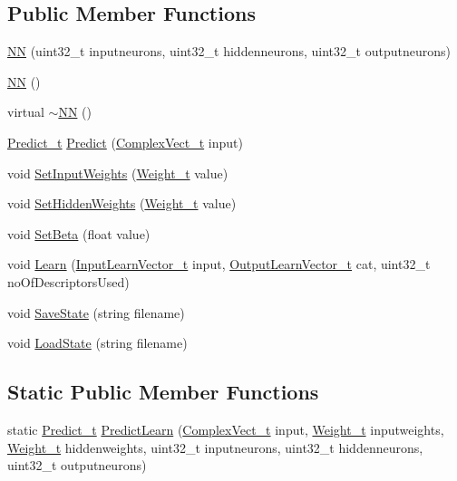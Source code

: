 \subsection*{Public Member Functions}
\begin{DoxyCompactItemize}
\item 
\hyperlink{class_soil_math_1_1_n_n_a46efd1eb7e31be2818c9858b640fcb5b}{N\+N} (uint32\+\_\+t inputneurons, uint32\+\_\+t hiddenneurons, uint32\+\_\+t outputneurons)
\item 
\hyperlink{class_soil_math_1_1_n_n_a778606ea8a193479da233a030d1df234}{N\+N} ()
\item 
virtual \hyperlink{class_soil_math_1_1_n_n_a37cb0ebe3576af3cf47c2e6330e1b34a}{$\sim$\+N\+N} ()
\item 
\hyperlink{_soil_math_types_8h_aaeba766195a440b2539f0438d3d41f95}{Predict\+\_\+t} \hyperlink{class_soil_math_1_1_n_n_aa7f23fcdb8383a74586c9c30b8bc0af7}{Predict} (\hyperlink{_soil_math_types_8h_a7567e521c2b2c408dcb62dbff72390f7}{Complex\+Vect\+\_\+t} input)
\item 
void \hyperlink{class_soil_math_1_1_n_n_a411371d8297e9d1ff10c919d1293d80e}{Set\+Input\+Weights} (\hyperlink{_soil_math_types_8h_ac56ad2b88186620fd0de0d213aa715dd}{Weight\+\_\+t} value)
\item 
void \hyperlink{class_soil_math_1_1_n_n_a8465f4fd2aebe181601c4be31df47ffd}{Set\+Hidden\+Weights} (\hyperlink{_soil_math_types_8h_ac56ad2b88186620fd0de0d213aa715dd}{Weight\+\_\+t} value)
\item 
void \hyperlink{class_soil_math_1_1_n_n_a5a73fdf65b39d81b6185de3a3b315cdb}{Set\+Beta} (float value)
\item 
void \hyperlink{class_soil_math_1_1_n_n_a8550b524ed096712bb2fad9fa57b8c8d}{Learn} (\hyperlink{_soil_math_types_8h_a45aa81992bf0ddf272907bd4fa0b96cf}{Input\+Learn\+Vector\+\_\+t} input, \hyperlink{_soil_math_types_8h_a2d8b5a261688166d724b68addd8561e6}{Output\+Learn\+Vector\+\_\+t} cat, uint32\+\_\+t no\+Of\+Descriptors\+Used)
\item 
void \hyperlink{class_soil_math_1_1_n_n_ac01bcc755578095ebf1f1f0e951f2678}{Save\+State} (string filename)
\item 
void \hyperlink{class_soil_math_1_1_n_n_a69c00e336b11531e25d51262da10fea0}{Load\+State} (string filename)
\end{DoxyCompactItemize}
\subsection*{Static Public Member Functions}
\begin{DoxyCompactItemize}
\item 
static \hyperlink{_soil_math_types_8h_aaeba766195a440b2539f0438d3d41f95}{Predict\+\_\+t} \hyperlink{class_soil_math_1_1_n_n_ac758bdef758439af30a62c486dff79ca}{Predict\+Learn} (\hyperlink{_soil_math_types_8h_a7567e521c2b2c408dcb62dbff72390f7}{Complex\+Vect\+\_\+t} input, \hyperlink{_soil_math_types_8h_ac56ad2b88186620fd0de0d213aa715dd}{Weight\+\_\+t} inputweights, \hyperlink{_soil_math_types_8h_ac56ad2b88186620fd0de0d213aa715dd}{Weight\+\_\+t} hiddenweights, uint32\+\_\+t inputneurons, uint32\+\_\+t hiddenneurons, uint32\+\_\+t outputneurons)
\end{DoxyCompactItemize}
